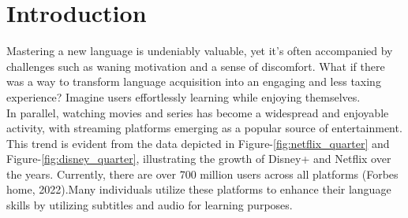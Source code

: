 \documentclass[12pt]{article}
\begin{document}
\section{Introduction}
Mastering a new language is undeniably valuable, yet it's often accompanied by challenges such as waning motivation and a sense of discomfort. What if there was a way to transform language acquisition into an engaging and less taxing experience? Imagine users effortlessly learning while enjoying themselves. \\
In parallel, watching movies and series has become a widespread and enjoyable activity, with streaming platforms emerging as a popular source of entertainment. This trend is evident from the data depicted in Figure-\ref{fig:netflix_quarter} and Figure-\ref{fig:disney_quarter}, illustrating the growth of Disney+ and Netflix over the years. Currently, there are over 700 million users across all platforms (Forbes home, 2022).Many individuals utilize these platforms to enhance their language skills by utilizing subtitles and audio for learning purposes. 
\end{document}
